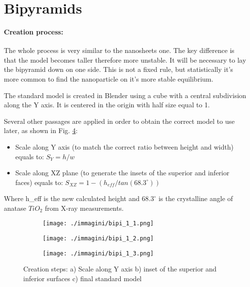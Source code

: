 \section{Bipyramids}

\paragraph{Creation process: }

The whole process is very similar to the nanosheets one. The key difference is that the model becomes taller therefore more unstable. It will be necessary to lay the bipyramid down on one side. This is not a fixed rule, but statistically it's more common to find the nanoparticle on it's more stable equilibrium.

The standard model is created in Blender using a cube with a central subdivision along the Y axis. It is centered in the origin with half size equal to 1.

Several other passages are applied in order to obtain the correct model to use later, as shown in Fig. \ref{fig:bipyramids_process}:

\begin{itemize}
    \item Scale along Y axis (to match the correct ratio between height and width) equals to: $S_Y = h / w$
    \item Scale along XZ plane (to generate the insets of the superior and inferior faces) equals to: $S_{XZ} = 1 - (h_{eff} / tan(68.3^{\circ}))$
\end{itemize}

Where h\_eff is the new calculated height and $68.3^{\circ}$ is the crystalline angle of anatase $TiO_2$ from X-ray measurements.

\newpage

\begin{figure}[ht]
    \centering
    \begin{subfigure}[b]{0.3\textwidth}
        \texttt{[image: ./immagini/bipi\_1\_1.png]}
        \caption{}
        \label{fig:bipyramids_process1}
    \end{subfigure}
    \hfill
    \begin{subfigure}[b]{0.3\textwidth}
        \texttt{[image: ./immagini/bipi\_1\_2.png]}
        \caption{}
        \label{fig:bipyramids_process2}
    \end{subfigure}
    \hfill
    \begin{subfigure}[b]{0.3\textwidth}
        \texttt{[image: ./immagini/bipi\_1\_3.png]}
        \caption{}
        \label{fig:bipyramids_process3}
    \end{subfigure}
    \caption{Creation steps: a) Scale along Y axis b) inset of the superior and inferior surfaces c) final standard model}
    \label{fig:bipyramids_process}
\end{figure}

